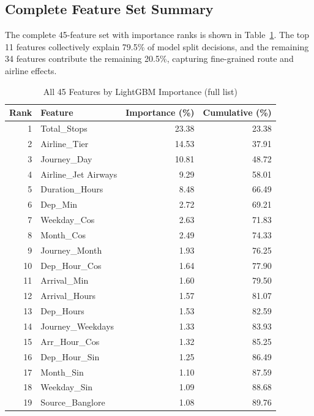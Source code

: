 \documentclass[12pt, a4paper]{article}
\begin{document}
\subsection{Complete Feature Set Summary}

The complete 45-feature set with importance ranks is shown in
Table~\ref{tab:all_features}.  The top 11 features collectively explain 79.5\%
of model split decisions, and the remaining 34 features contribute the
remaining 20.5\%, capturing fine-grained route and airline effects.

\begin{table}[h]
\caption{All 45 Features by LightGBM Importance (full list)}
\label{tab:all_features}
\centering
\small
\begin{tabular}{rlrr}
\toprule
\textbf{Rank} & \textbf{Feature} & \textbf{Importance (\%)} & \textbf{Cumulative (\%)} \\
\midrule
1  & Total\_Stops               & 23.38 & 23.38 \\
2  & Airline\_Tier              & 14.53 & 37.91 \\
3  & Journey\_Day               & 10.81 & 48.72 \\
4  & Airline\_Jet Airways       &  9.29 & 58.01 \\
5  & Duration\_Hours            &  8.48 & 66.49 \\
6  & Dep\_Min                   &  2.72 & 69.21 \\
7  & Weekday\_Cos               &  2.63 & 71.83 \\
8  & Month\_Cos                 &  2.49 & 74.33 \\
9  & Journey\_Month             &  1.93 & 76.25 \\
10 & Dep\_Hour\_Cos             &  1.64 & 77.90 \\
11 & Arrival\_Min               &  1.60 & 79.50 \\
12 & Arrival\_Hours             &  1.57 & 81.07 \\
13 & Dep\_Hours                 &  1.53 & 82.59 \\
14 & Journey\_Weekdays          &  1.33 & 83.93 \\
15 & Arr\_Hour\_Cos             &  1.32 & 85.25 \\
16 & Dep\_Hour\_Sin             &  1.25 & 86.49 \\
17 & Month\_Sin                 &  1.10 & 87.59 \\
18 & Weekday\_Sin               &  1.09 & 88.68 \\
19 & Source\_Banglore           &  1.08 & 89.76 \\

\end{tabular}
\end{table}
\end{document}
